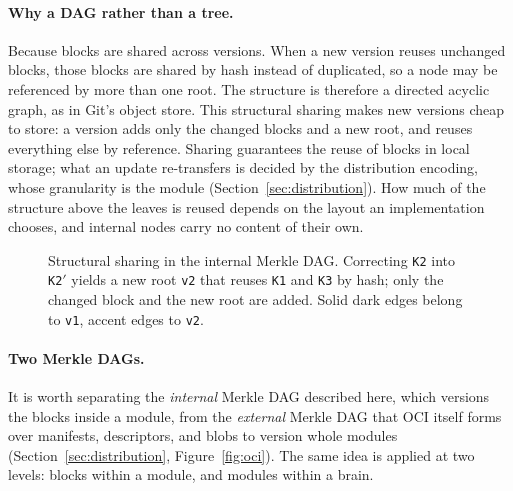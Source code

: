 \documentclass[11pt,a4paper]{article}
\begin{document}
\paragraph{Why a DAG rather than a tree.}
Because blocks are shared across versions. When a new version reuses unchanged
blocks, those blocks are shared by hash instead of duplicated, so a node may be
referenced by more than one root. The structure is therefore a directed acyclic
graph, as in Git's object store. This structural sharing makes new versions cheap to store: a version adds only
the changed blocks and a new root, and reuses everything else by reference.
Sharing guarantees the reuse of blocks in local storage; what an update
re-transfers is decided by the distribution encoding, whose granularity is the
module (Section~\ref{sec:distribution}). How much of the structure above the
leaves is reused depends on the layout an implementation chooses, and internal
nodes carry no content of their own.



\begin{figure}[t]
\centering
{}
\caption{Structural sharing in the internal Merkle DAG. Correcting \texttt{K2}
into \texttt{K2$'$} yields a new root \texttt{v2} that reuses \texttt{K1} and
\texttt{K3} by hash; only the changed block and the new root are added. Solid
dark edges belong to \texttt{v1}, accent edges to \texttt{v2}.}
\label{fig:merkle}
\end{figure}

\paragraph{Two Merkle DAGs.}
It is worth separating the \emph{internal} Merkle DAG described here, which
versions the blocks inside a module, from the \emph{external} Merkle DAG that
OCI itself forms over manifests, descriptors, and blobs to version whole
modules (Section~\ref{sec:distribution}, Figure~\ref{fig:oci}). The same idea
is applied at two levels: blocks within a module, and modules within a brain.
\end{document}
